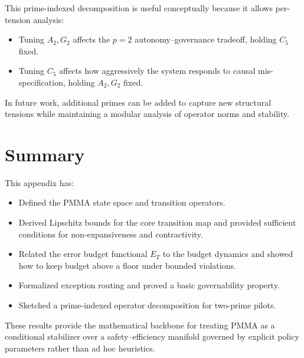 \documentclass[11pt]{article}
\begin{document}
This prime-indexed decomposition is useful conceptually because it allows per-tension analysis:
\begin{itemize}
  \item Tuning $A_2,G_2$ affects the $p=2$ autonomy--governance tradeoff, holding $C_5$ fixed.
  \item Tuning $C_5$ affects how aggressively the system responds to causal mis-specification, holding $A_2,G_2$ fixed.
\end{itemize}
In future work, additional primes can be added to capture new structural tensions while maintaining a modular analysis of operator norms and stability.

\section*{Summary}

This appendix has:
\begin{itemize}
  \item Defined the PMMA state space and transition operators.
  \item Derived Lipschitz bounds for the core transition map and provided sufficient conditions for non-expansiveness and contractivity.
  \item Related the error budget functional $E_T$ to the budget dynamics and showed how to keep budget above a floor under bounded violations.
  \item Formalized exception routing and proved a basic governability property.
  \item Sketched a prime-indexed operator decomposition for two-prime pilots.
\end{itemize}
These results provide the mathematical backbone for treating PMMA as a conditional stabilizer over a safety--efficiency manifold governed by explicit policy parameters rather than ad hoc heuristics.


\nocite{*}
  
  
\end{document}

